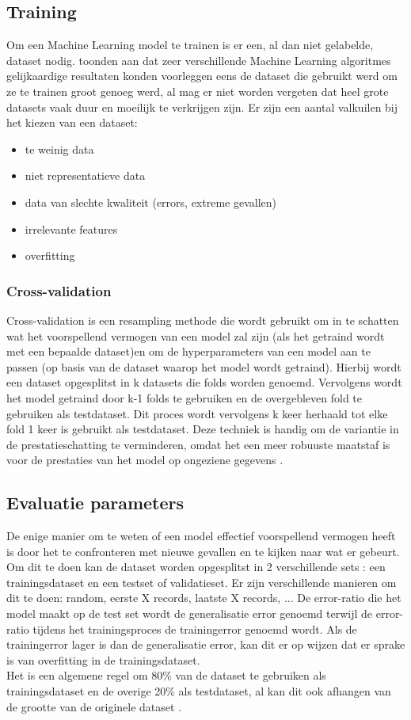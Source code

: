 \subsection{Training}
Om een Machine Learning model te trainen is er een, al dan niet gelabelde, dataset nodig. \textcite{Banko2001} toonden aan dat zeer verschillende Machine Learning algoritmes gelijkaardige resultaten konden voorleggen eens de dataset die gebruikt werd om ze te trainen groot genoeg werd, al mag er niet worden vergeten dat heel grote datasets vaak duur en moeilijk te verkrijgen zijn.  Er zijn een aantal valkuilen bij het kiezen van een dataset:
\begin{itemize}[]
    \item te weinig data
    \item niet representatieve data 
    \item data van slechte kwaliteit (errors, extreme gevallen)
    \item irrelevante features
    \item overfitting
\end{itemize}
\autocite{Geron}

\subsubsection{Cross-validation}
Cross-validation is een resampling methode die wordt gebruikt om in te schatten wat het voorspellend vermogen van een model zal zijn (als het getraind wordt met een bepaalde dataset)en om de hyperparameters van een model aan te passen (op basis van de dataset waarop het model wordt getraind). Hierbij wordt een dataset opgesplitst in k datasets die folds worden genoemd. Vervolgens wordt het model getraind door k-1 folds te gebruiken en de overgebleven fold te gebruiken als testdataset. Dit proces wordt vervolgens k keer herhaald tot elke fold 1 keer is gebruikt als testdataset.
Deze techniek is handig om de variantie in de prestatieschatting te verminderen, omdat het een meer robuuste maatstaf is voor de prestaties van het model op ongeziene gegevens \autocite{Daniel2019}.

\subsection{Evaluatie parameters}
De enige manier om te weten of een model effectief voorspellend vermogen heeft is door het te confronteren met nieuwe gevallen en te kijken naar wat er gebeurt. Om dit te doen kan de dataset worden opgesplitst in 2 verschillende sets : een trainingsdataset en een testset of validatieset. Er zijn verschillende manieren om dit te doen: random, eerste X records, laatste X records, ... De error-ratio die het model maakt op de test set wordt de generalisatie error genoemd terwijl de error-ratio tijdens het trainingsproces de trainingerror genoemd wordt. Als de trainingerror lager is dan de generalisatie error, kan dit er op wijzen dat er sprake is van overfitting in de trainingsdataset.\\
Het is een algemene regel om 80\% van de dataset te gebruiken als trainingsdataset en de overige 20\% als testdataset, al kan dit ook afhangen van de grootte van de originele dataset \autocite{Geron}. 

